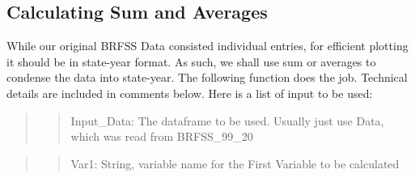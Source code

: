 \documentclass[
]{article}
\newenvironment{Shaded}{\begin{snugshade}}{\end{snugshade}}
\newcommand{\AttributeTok}[1]{\textcolor[rgb]{0.77,0.63,0.00}{#1}}
\newcommand{\ConstantTok}[1]{\textcolor[rgb]{0.00,0.00,0.00}{#1}}
\newcommand{\ControlFlowTok}[1]{\textcolor[rgb]{0.13,0.29,0.53}{\textbf{#1}}}
\newcommand{\DecValTok}[1]{\textcolor[rgb]{0.00,0.00,0.81}{#1}}
\newcommand{\DocumentationTok}[1]{\textcolor[rgb]{0.56,0.35,0.01}{\textbf{\textit{#1}}}}
\newcommand{\FunctionTok}[1]{\textcolor[rgb]{0.00,0.00,0.00}{#1}}
\newcommand{\NormalTok}[1]{#1}
\newcommand{\OtherTok}[1]{\textcolor[rgb]{0.56,0.35,0.01}{#1}}
\newcommand{\SpecialCharTok}[1]{\textcolor[rgb]{0.00,0.00,0.00}{#1}}
\begin{document}
\begin{Shaded}
\end{Shaded}

\hypertarget{calculating-sum-and-averages}{%
\subsection{Calculating Sum and
Averages}\label{calculating-sum-and-averages}}

While our original BRFSS Data consisted individual entries, for
efficient plotting it should be in state-year format. As such, we shall
use sum or averages to condense the data into state-year. The following
function does the job. Technical details are included in comments below.
Here is a list of input to be used:

\begin{quote}
\begin{quote}
Input\_Data: The dataframe to be used. Usually just use Data, which was
read from BRFSS\_99\_20
\end{quote}
\end{quote}

\begin{quote}
\begin{quote}
Var1: String, variable name for the First Variable to be calculated
\end{quote}
\end{quote}
\end{document}
